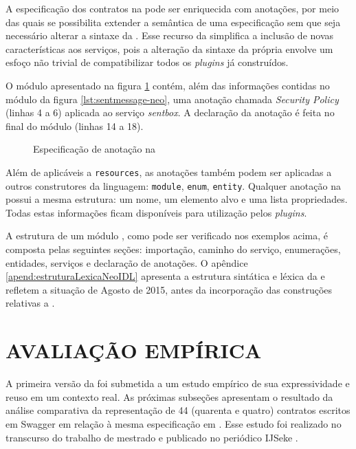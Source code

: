A especificação dos contratos na \neoidl{} pode ser enriquecida com
anotações, por meio das quais se possibilita extender a semântica de uma
especificação sem que seja necessário alterar a sintaxe da \neoidl{}. Esse
recurso da \neoidl{} simplifica a inclusão de novas características aos
serviços, pois a alteração da sintaxe da própria \neoidl{} envolve um esfoço não
trivial de compatibilizar todos os \textit{plugins} já construídos.

O módulo apresentado na figura \ref{lst:annotationNeoIDL} contém, além das
informações contidas no módulo da figura \ref{lst:sentmessage-neo}, uma anotação chamada
\emph{Security Policy} (linhas 4 a 6) aplicada ao serviço \emph{sentbox}. A
declaração da anotação é feita no final do módulo (linhas 14 a 18).

\vspace{6mm}
 
\begin{figure}
\begin{small}

\vspace{-.5cm}
\end{small}
\caption{Especificação de anotação na \neoidl{}}
\label{lst:annotationNeoIDL}
\end{figure}

Além de aplicáveis a \texttt{resources}, as anotações também podem ser aplicadas
a outros construtores da linguagem: \texttt{module}, \texttt{enum},
\texttt{entity}. Qualquer anotação na \neoidl{} possui a mesma estrutura: um
nome, um elemento alvo e uma lista propriedades. Todas estas informações ficam
disponíveis para utilização pelos \textit{plugins}.

A estrutura de um módulo \neoidl{}, como pode ser verificado nos exemplos
acima, é composta pelas seguintes seções: importação, caminho do serviço,
enumerações, entidades, serviços e declaração de anotações. O apêndice 
\ref{apend:estruturaLexicaNeoIDL} apresenta a estrutura sintática e léxica da
\neoidl{} e refletem a situação de Agosto de 2015, antes da incorporação das 
construções relativas a \designbycontract{}.



\section{AVALIAÇÃO EMPÍRICA}
\vspace{-6mm}

A primeira versão da \neoidl{} foi submetida a um estudo empírico de sua expressividade 
e reuso em um contexto real. As próximas subseções apresentam 
o resultado da análise comparativa da representação de 44 (quarenta e quatro)
contratos escritos em Swagger em relação à mesma especificação em \neoidl{}.
Esse estudo foi realizado no transcurso do trabalho de mestrado e 
publicado no periódico IJSeke \cite{lima2015neoidl}.

